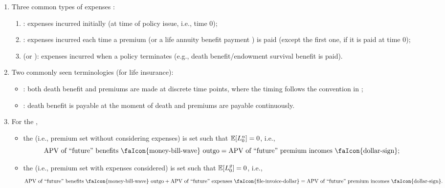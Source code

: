 \begin{enumerate}
\item Three common types of expenses :
\begin{enumerate}
\item {}: expenses incurred initially (at time of policy
issue, i.e., time 0);
\item {}: expenses incurred each time a premium
 (or a life annuity benefit payment
) is paid (except the first one, if it is paid at time
0);
\item {} (or ): expenses
incurred when a policy terminates  (e.g., death
benefit/endowment survival benefit is paid).
\end{enumerate}

\item Two commonly seen terminologies (for life insurance):
\begin{itemize}
\item {}: both death benefit and premiums are made at
discrete time points, where the timing follows the convention in
;

\item {}: death benefit is payable at the moment of death
and premiums are payable continuously.
\end{itemize}

\item For the ,
\begin{itemize}
\item the  (i.e., premium set without considering expenses)
is set such that \(\mathbb{E}\qty[L_0^n]=0\), i.e.,
\[
\text{APV of ``future'' benefits \faIcon{money-bill-wave} outgo} = \text{APV of
``future'' premium incomes \faIcon{dollar-sign}}; 
\]

\item the  (i.e., premium set with expenses considered) is
set such that \(\mathbb{E}\qty[L_0^g]=0\), i.e.,
\[
\text{APV of ``future'' benefits \faIcon{money-bill-wave} outgo}
+ \text{APV of ``future'' expenses \faIcon{file-invoice-dollar}}
=\text{APV of ``future'' premium incomes \faIcon{dollar-sign}}.
\]
\end{itemize}
\end{enumerate}

